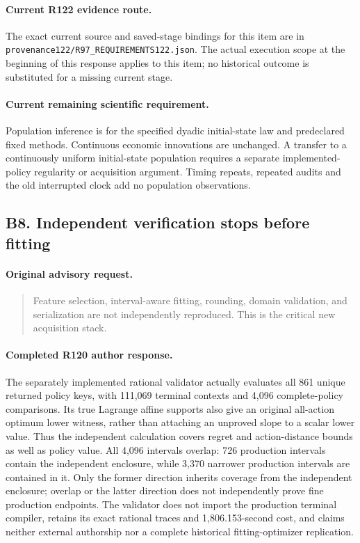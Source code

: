 \paragraph{Current R122 evidence route.}
The exact current source and saved-stage bindings for this item are in \nolinkurl{provenance122/R97_REQUIREMENTS122.json}. The actual execution scope at the beginning of this response applies to this item; no historical outcome is substituted for a missing current stage.
\paragraph{Current remaining scientific requirement.}
Population inference is for the specified dyadic initial-state law and predeclared fixed methods. Continuous economic innovations are unchanged. A transfer to a continuously uniform initial-state population requires a separate implemented-policy regularity or acquisition argument. Timing repeats, repeated audits and the old interrupted clock add no population observations.

\subsection{B8. Independent verification stops before fitting}
\label{response122:B8}

\paragraph{Original advisory request.}
\begin{quote}
Feature selection, interval-aware fitting, rounding, domain validation, and serialization are not independently reproduced. This is the critical new acquisition stack.
\end{quote}

\paragraph{Completed R120 author response.}
The separately implemented rational validator actually evaluates all 861 unique returned policy keys, with 111,069 terminal contexts and 4,096 complete-policy comparisons. Its true Lagrange affine supports also give an original all-action optimum lower witness, rather than attaching an unproved slope to a scalar lower value. Thus the independent calculation covers regret and action-distance bounds as well as policy value. All 4,096 intervals overlap: 726 production intervals contain the independent enclosure, while 3,370 narrower production intervals are contained in it. Only the former direction inherits coverage from the independent enclosure; overlap or the latter direction does not independently prove fine production endpoints. The validator does not import the production terminal compiler, retains its exact rational traces and 1,806.153-second cost, and claims neither external authorship nor a complete historical fitting-optimizer replication.

